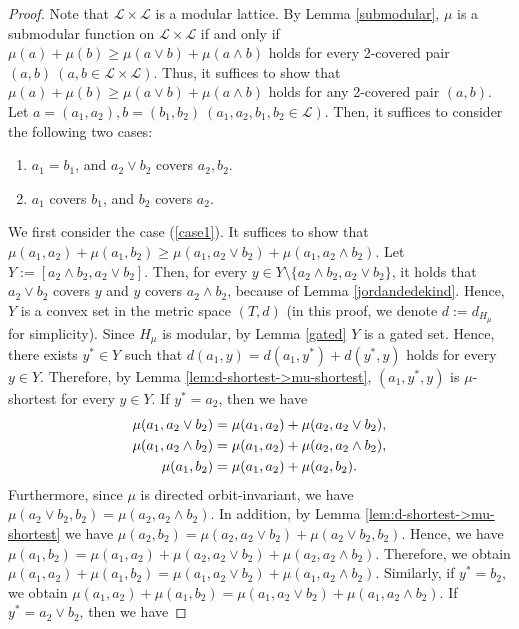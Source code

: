 \documentclass[11pt]{article}
\theoremstyle{definition}
\begin{document}
\begin{proof}
Note that $\mathcal{L}\times \mathcal{L}$ is a modular lattice. By Lemma \ref{submodular}, $\mu$ is a submodular function on $\mathcal{L}\times \mathcal{L}$ if and only if $\mu(a)+\mu(b)\geq \mu(a\vee b)+\mu(a\wedge b)$ holds for every 2-covered pair $(a,b)\ (a,b\in \mathcal{L}\times \mathcal{L})$. Thus, it suffices to show that $\mu(a)+\mu(b)\geq \mu(a\vee b)+\mu(a\wedge b)$ holds for any 2-covered pair $(a,b)$. Let $a=(a_1,a_2),b=(b_1,b_2)\ (a_1,a_2,b_1,b_2\in \mathcal{L})$. Then, it suffices to consider  the following two cases:
\begin{enumerate}[label=(\roman*),ref=\roman*]
    \item $a_1=b_1$, and $a_2\vee b_2$ covers $a_2,b_2$.
    \label{case1}
    \item $a_1$ covers $b_1$, and $b_2$ covers $a_2$.
    \label{case2}
\end{enumerate}
We first consider the case (\ref{case1}). It suffices to show that $\mu(a_1,a_2)+\mu(a_1,b_2)\geq \mu(a_1,a_2\vee b_2)+\mu(a_1,a_2\wedge b_2)$. Let $Y:=[a_2\wedge b_2,a_2\vee b_2]$. Then, for every $y\in Y\setminus \{a_2\wedge b_2,a_2\vee b_2\}$, it holds that $a_2\vee b_2$ covers $y$ and $y$ covers $a_2\wedge b_2$, because of Lemma \ref{jordandedekind}. Hence, $Y$ is a convex set in the metric space $(T,d)$ (in this proof, we denote $d:=d_{H_\mu}$ for simplicity). Since $H_\mu$ is modular, by Lemma \ref{gated} $Y$ is a gated set. Hence, there exists $y^*\in Y$ such that $d(a_1,y)=d(a_1,y^*)+d(y^*,y)$ holds for every $y\in Y$. Therefore, by Lemma \ref{lem:d-shortest->mu-shortest}, $(a_1,y^*,y)$ is $\mu$-shortest for every $y\in Y$. If $y^*=a_2$, then we have
\begin{align}
    \mu(a_1,a_2\vee b_2)&=\mu(a_1,a_2)+\mu(a_2,a_2\vee b_2),\notag\\
    \mu(a_1,a_2\wedge b_2)&=\mu(a_1,a_2)+\mu(a_2,a_2\wedge b_2), \notag \\
    \mu(a_1,b_2)&=\mu(a_1,a_2)+\mu(a_2,b_2).
\end{align}
Furthermore, since $\mu$ is directed orbit-invariant, we have $\mu(a_2\vee b_2,b_2)=\mu(a_2,a_2\wedge b_2)$. In addition, by Lemma \ref{lem:d-shortest->mu-shortest} we have $\mu(a_2,b_2)=\mu(a_2,a_2\vee b_2)+\mu(a_2\vee b_2,b_2)$. Hence, we have $\mu(a_1,b_2)=\mu(a_1,a_2)+\mu(a_2,a_2\vee b_2)+\mu(a_2,a_2\wedge b_2)$. Therefore, we obtain $\mu(a_1,a_2)+\mu(a_1,b_2)=\mu(a_1,a_2\vee b_2)+\mu(a_1,a_2\wedge b_2)$. Similarly, if $y^*=b_2$, we obtain $\mu(a_1,a_2)+\mu(a_1,b_2)=\mu(a_1,a_2\vee b_2)+\mu(a_1,a_2\wedge b_2)$. If $y^*=a_2\vee b_2$, then we have

\end{proof}
\end{document}
